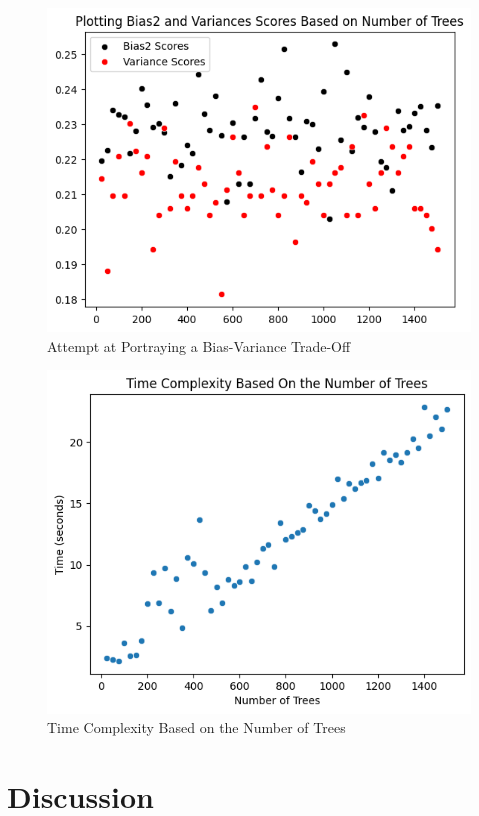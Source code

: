 \documentclass[journal]{IEEEtran}
\begin{document}
\begin{figure}
    \centering
    \includegraphics[width=1\linewidth]{bas2_variance_to.png}
    \caption{Attempt at Portraying a Bias-Variance Trade-Off}
    \label{fig:enter-label}
\end{figure}

\begin{figure}
    \centering
    \includegraphics[width=1\linewidth]{time_complexity_nt_tuning.png}
    \caption{Time Complexity Based on the Number of Trees}
    \label{fig:enter-label}
\end{figure}

\section{Discussion}
\end{document}
